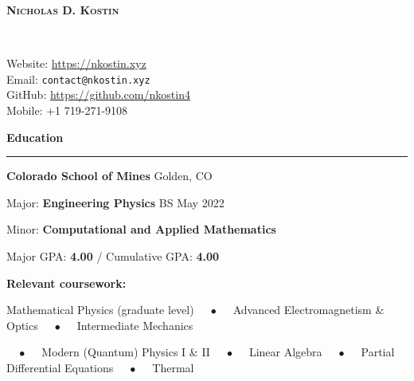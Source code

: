 \documentclass{article}
\numberwithin{equation}{section}
\begin{document}
\begin{minipage}{0.63\textwidth}
\begin{flushleft}
\textsc{\Huge{\textbf{Nicholas D. Kostin}}}
\end{flushleft}
\end{minipage}
~
\begin{minipage}{0.35\textwidth}
\begin{flushright}
\parbox[c]{\textwidth}{Website: \url{https://nkostin.xyz} \\ Email: \texttt{contact@nkostin.xyz} \\ GitHub: \url{https://github.com/nkostin4} \\ Mobile: +1 719-271-9108}
\end{flushright}
\end{minipage}

\vspace{1em}

\textbf{\Large{Education}} \\[-0.5em]
\rule{\textwidth}{1pt}

\hspace{1.5em} \textbf{Colorado School of Mines} \hfill Golden, CO

\hspace{1.5em} Major: \textbf{Engineering Physics} \hfill BS May 2022

\hspace{1.5em} Minor: \textbf{Computational and Applied Mathematics}

\vspace{1em}

\hspace{1.5em} Major GPA: \textbf{4.00} / Cumulative GPA: \textbf{4.00}

\vspace{1em}

\hspace{1.5em} \textbf{Relevant coursework:}

\hspace{3.0em} Mathematical Physics (graduate level) $\quad\bullet\quad$ Advanced Electromagnetism \& Optics $\quad\bullet\quad$ Intermediate Mechanics

\hspace{3.0em} $\quad\bullet\quad$ Modern (Quantum) Physics I \& II $\quad\bullet\quad$ Linear Algebra $\quad\bullet\quad$ Partial Differential Equations $\quad\bullet\quad$ Thermal
\end{document}
